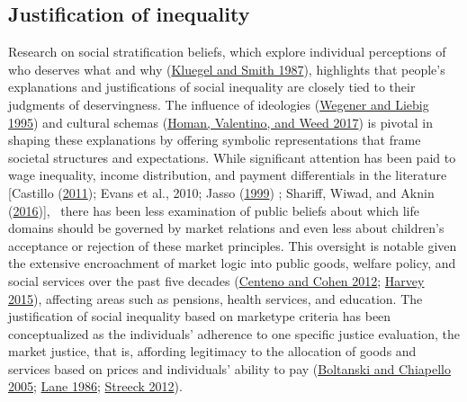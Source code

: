 \documentclass[
  letterpaper,
  DIV=11,
  numbers=noendperiod]{scrartcl}
\begin{document}
\hypertarget{justification-of-inequality}{%
\subsection{Justification of
inequality}\label{justification-of-inequality}}

Research on social stratification beliefs, which explore individual
perceptions of who deserves what and why
(\protect\hyperlink{ref-kluegel_beliefs_1987}{Kluegel and Smith 1987}),
highlights that people's explanations and justifications of social
inequality are closely tied to their judgments of deservingness. The
influence of ideologies
(\protect\hyperlink{ref-wegener_dominant_1995}{Wegener and Liebig 1995})
and cultural schemas (\protect\hyperlink{ref-homan_being_2017}{Homan,
Valentino, and Weed 2017}) is pivotal in shaping these explanations by
offering symbolic representations that frame societal structures and
expectations. While significant attention has been paid to wage
inequality, income distribution, and payment differentials in the
literature {[}Castillo
(\protect\hyperlink{ref-castillo_legitimacy_2011}{2011}); Evans et al.,
2010; Jasso (\protect\hyperlink{ref-jasso_how_1999}{1999}) ; Shariff,
Wiwad, and Aknin
(\protect\hyperlink{ref-shariff_income_2016}{2016}){]},~ there has been
less examination of public beliefs about which life domains should be
governed by market relations and even less about children's acceptance
or rejection of these market principles. This oversight is notable given
the extensive encroachment of market logic into public goods, welfare
policy, and social services over the past five decades
(\protect\hyperlink{ref-centeno_arc_2012}{Centeno and Cohen 2012};
\protect\hyperlink{ref-harvey_breve_2015}{Harvey 2015}), affecting areas
such as pensions, health services, and education. The justification of
social inequality based on marketype criteria has been conceptualized as
the individuals' adherence to one specific justice evaluation, the
market justice, that is, affording legitimacy to the allocation of goods
and services based on prices and individuals' ability to pay
(\protect\hyperlink{ref-boltanski_new_2005}{Boltanski and Chiapello
2005}; \protect\hyperlink{ref-lane_market_1986}{Lane 1986};
\protect\hyperlink{ref-streeck_citizens_2012}{Streeck 2012}).
\end{document}
